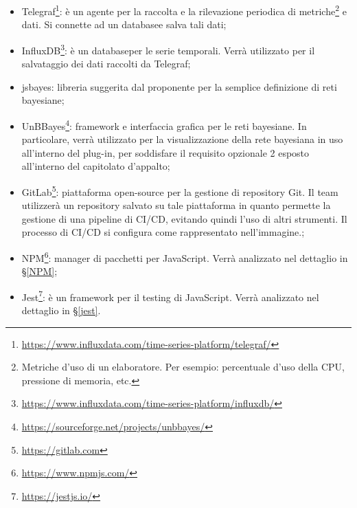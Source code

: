 \begin{itemize} 
	\item Telegraf\glossario\footnote{\url{https://www.influxdata.com/time-series-platform/telegraf/}}: è un agente per la raccolta e la rilevazione periodica di metriche\footnote{Metriche d'uso di un elaboratore. Per esempio: percentuale d'uso della CPU, pressione di memoria, etc.} e dati. Si connette ad un database\glossario e salva tali dati;
	\item InfluxDB\glossario\footnote{\url{https://www.influxdata.com/time-series-platform/influxdb/}}: è un database\glossario per le serie temporali. Verrà utilizzato per il salvataggio dei dati raccolti da Telegraf;
	\item jsbayes\glossario: libreria suggerita dal proponente per la semplice definizione di reti bayesiane; 
	\item UnBBayes\glossario\footnote{\url{https://sourceforge.net/projects/unbbayes/}}: framework e interfaccia grafica per le reti bayesiane. In particolare, verrà utilizzato per la visualizzazione della rete bayesiana in uso all'interno del plug-in, per soddisfare il requisito opzionale 2 esposto all'interno del capitolato d'appalto;
	\item GitLab\glossario\footnote{\url{https://gitlab.com}}: piattaforma open-source per la gestione di repository Git. Il team utilizzerà un repository salvato su tale piattaforma in quanto permette la gestione di una pipeline di CI/CD\glossario, evitando quindi l'uso di altri strumenti. Il processo di CI/CD si configura come rappresentato nell'immagine.;
	\item NPM\glossario\footnote{\url{https://www.npmjs.com/}}: manager di pacchetti per JavaScript. Verrà analizzato nel dettaglio in §\ref{NPM};
	\item Jest\footnote{\url{https://jestjs.io/}}: è un framework per il testing di JavaScript. Verrà analizzato nel dettaglio in §\ref{jest}.
\end{itemize}

